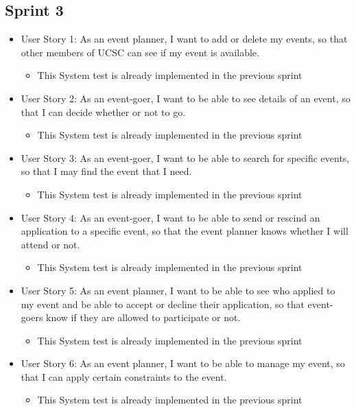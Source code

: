 \documentclass[10pt]{article}
\newcommand{\fancysub}[2] {{\color{primary}\subsection{#1} \label{sec:#2}}}
\begin{document}
	\fancysub{Sprint 3}{sprint3}
	
		\begin{itemize}
			\item User Story 1: As an event planner, I want to add or delete my events, so that other members of UCSC can see if my event is available.
	    	\begin{itemize}
	    		\item This System test is already implemented in the previous sprint
	    	\end{itemize}

			\item User Story 2: As an event-goer, I want to be able to see details of an event, so that I can decide whether or not to go.
	    	\begin{itemize}
	    		\item This System test is already implemented in the previous sprint
	    	\end{itemize}
	    	
			\item User Story 3: As an event-goer, I want to be able to search for specific events, so that I may find the event that I need.
	    	\begin{itemize}
	    		\item This System test is already implemented in the previous sprint
	    	\end{itemize}
	    	
			\item User Story 4: As an event-goer, I want to be able to send or rescind an application to a specific event, so that the event planner knows whether I will attend or not.
	    	\begin{itemize}
	    		\item This System test is already implemented in the previous sprint
	    	\end{itemize}
	    	
			\item User Story 5: As an event planner, I want to be able to see who applied to my event and be able to accept or decline their application, so that event-goers know if they are allowed to participate or not.
	    	\begin{itemize}
	    		\item This System test is already implemented in the previous sprint
	    	\end{itemize}

			\item User Story 6: As an event planner, I want to be able to manage my event, so that I can apply certain constraints to the event.
	    	\begin{itemize}
	    		\item This System test is already implemented in the previous sprint
	    	\end{itemize}
			

\end{itemize}
\end{document}
